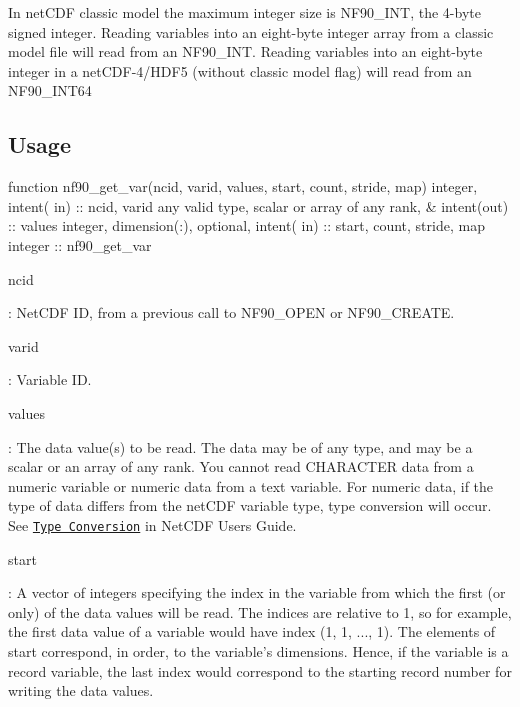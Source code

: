 In net\+C\+DF classic model the maximum integer size is N\+F90\+\_\+\+I\+NT, the 4-\/byte signed integer. Reading variables into an eight-\/byte integer array from a classic model file will read from an N\+F90\+\_\+\+I\+NT. Reading variables into an eight-\/byte integer in a net\+C\+D\+F-\/4/\+H\+D\+F5 (without classic model flag) will read from an N\+F90\+\_\+\+I\+N\+T64

\subsection*{Usage}


\begin{DoxyCode}
\textcolor{keyword}{function }nf90\_get\_var(ncid, varid, values, start, count, stride, map)
  \textcolor{keywordtype}{integer},                         \textcolor{keywordtype}{intent( in)} :: ncid, varid
  any valid \textcolor{keywordtype}{type}, scalar or array of any rank, &
                                   \textcolor{keywordtype}{intent(out)} :: values
  \textcolor{keywordtype}{integer}, \textcolor{keywordtype}{dimension(:)}, \textcolor{keywordtype}{optional}, \textcolor{keywordtype}{intent( in)} :: start, count, stride, map
  \textcolor{keywordtype}{integer}                                      :: nf90\_get\_var
\end{DoxyCode}


{\ttfamily ncid}

\+: Net\+C\+DF ID, from a previous call to N\+F90\+\_\+\+O\+P\+EN or N\+F90\+\_\+\+C\+R\+E\+A\+TE.

{\ttfamily varid}

\+: Variable ID.

{\ttfamily values}

\+: The data value(s) to be read. The data may be of any type, and may be a scalar or an array of any rank. You cannot read C\+H\+A\+R\+A\+C\+T\+ER data from a numeric variable or numeric data from a text variable. For numeric data, if the type of data differs from the net\+C\+DF variable type, type conversion will occur. See \href{netcdf.html#Type-Conversion}{\tt Type Conversion} in Net\+C\+DF Users Guide.

{\ttfamily start}

\+: A vector of integers specifying the index in the variable from which the first (or only) of the data values will be read. The indices are relative to 1, so for example, the first data value of a variable would have index (1, 1, ..., 1). The elements of start correspond, in order, to the variable’s dimensions. Hence, if the variable is a record variable, the last index would correspond to the starting record number for writing the data values.

